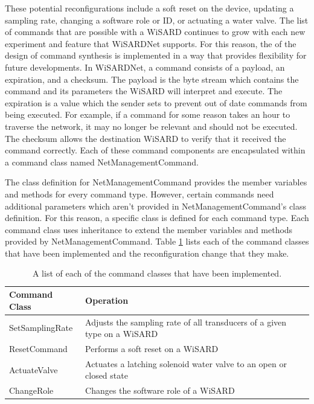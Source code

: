 These potential reconfigurations include a soft reset on the device, updating a sampling rate, changing a software role or ID, or actuating a water valve. The list of commands that are possible with a WiSARD continues to grow with each new experiment and feature that WiSARDNet supports. For this reason, the of the design of command synthesis is implemented in a way that provides flexibility for future developments. In WiSARDNet, a command consists of a payload, an expiration, and a checksum. The payload is the byte stream which contains the command and its parameters the WiSARD will interpret and execute. The expiration is a value which the sender sets to prevent out of date commands from being executed. For example, if a command for some reason takes an hour to traverse the network, it may no longer be relevant and should not be executed. The checksum allows the destination WiSARD to verify that it received the command correctly. Each of these command components are encapsulated within a command class named NetManagementCommand.

The class definition for NetManagementCommand provides the member variables and methods for every command type. However, certain commands need additional parameters which aren't provided in NetManagementCommand's class definition. For this reason, a specific class is defined for each command type. Each command class uses inheritance to extend the member variables and methods provided by NetManagementCommand. Table \ref{tab:commands} lists each of the command classes that have been implemented and the reconfiguration change that they make.\\

\begin{table}[H]
	\centering
	\renewcommand{\arraystretch}{1.1}
	\begin{tabular}{|p{3cm}|p{11cm}|}
	\hline
	Command Class & Operation\\
	\hline
	SetSamplingRate & Adjusts the sampling rate of all transducers of a given type on a WiSARD\\
	\hline
	ResetCommand & Performs a soft reset on a WiSARD\\
	\hline
	ActuateValve & Actuates a latching solenoid water valve to an open or closed state\\
	\hline
	ChangeRole & Changes the software role of a WiSARD \\
	\hline
	\end{tabular}
	\caption{A list of each of the command classes that have been implemented.}
	\label{tab:commands}
\end{table}

